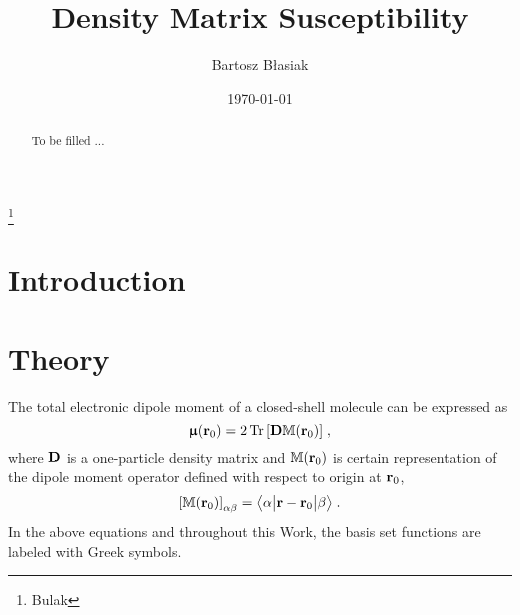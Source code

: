 \documentclass[aip,graphicx]{revtex4-1}
\newcommand{\tbraket}[3]{\ensuremath{\bigl\langle {#1} \bigl\lvert {#2} \bigl\lvert {#3} \bigr\rangle}}
\newcommand{\BM}[1]{\bm{#1}}
\DeclareMathOperator{\Tr}{Tr}
\begin{document}
\title{Density Matrix Susceptibility} %

\author{Bartosz B{\l}asiak}
\thanks{Bulak}

\date{\today}

\begin{abstract}
To be filled ...
\end{abstract}

\pacs{}%

\maketitle %

\section{\label{s:1}Introduction}

\section{\label{s:2}Theory}

The total electronic dipole moment of a closed-shell molecule can be expressed as
%
\begin{equation}\label{e:mu-total}
 {\BM{\upmu}}({\bf r}_0) = 
    2 \Tr{
        \left[
             {\bf D} {\mathbb{M}({\bf r}_0)}
        \right]} \;,
\end{equation}
%
where ${\bf D}$ is a one-particle density matrix and ${\mathbb{M}({\bf r}_0)}$ is certain representation
of the dipole moment operator defined with respect to origin at ${\bf r}_0$,
%
\begin{equation}\label{e:m}
 \left[ {\mathbb{M}({\bf r}_0)} \right]_{\alpha\beta} = \tbraket{\alpha}{{\bf r} - {\bf r}_0}{\beta} \;.
\end{equation}
%
In the above equations and throughout this Work, the basis set functions are labeled with Greek symbols.
\end{document}
